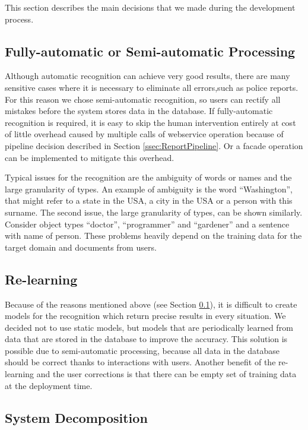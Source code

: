 
This section describes the main decisions that we made during the development process. 

\subsection{Fully-automatic or Semi-automatic Processing}
\label{ssec:processing}

Although automatic recognition can achieve very good results, there are many
sensitive cases where it is necessary to eliminate all errors,such as
police reports. For this reason we chose semi-automatic recognition, so users
can rectify all mistakes before the system stores data in the database. 
If fully-automatic recognition is required, it is easy
to skip the human intervention entirely at cost of little overhead caused by
multiple calls of webservice operation because of pipeline decision described in
Section \ref{ssec:ReportPipeline}. Or a facade operation can be implemented to
mitigate this overhead.

Typical issues for the recognition are the ambiguity of words or names and the
large granularity of types. An example of ambiguity is the word ``Washington'', that
might refer to a state in the USA, a city in the USA or a person with this surname.
The second issue, the large granularity of types, can be shown similarly.
Consider object types ``doctor'', ``programmer'' and ``gardener'' and a sentence with
name of person. These problems heavily depend on the training data for the
target domain and documents from users.

\subsection{Re-learning}

Because of the reasons mentioned above (see Section \ref{ssec:processing}),
it is difficult to create models for the recognition which return precise
results in every situation. We decided not to use static models, but models that
are periodically learned from data that are stored in the database to improve
the accuracy. This solution is possible due to semi-automatic processing,
because all data in the database should be correct thanks to interactions with
users. Another benefit of the re-learning and the user corrections is that there
can be empty set of training data at the deployment time.

\subsection{System Decomposition}

